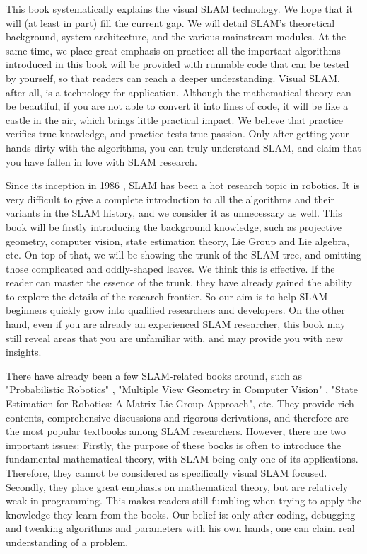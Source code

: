 This book systematically explains the visual SLAM technology. We hope that it will (at least in part) fill the current gap. We will detail SLAM's theoretical background, system architecture, and the various mainstream modules. At the same time, we place great emphasis on practice: all the important algorithms introduced in this book will be provided with runnable code that can be tested by yourself, so that readers can reach a deeper understanding. Visual SLAM, after all, is a technology for application. Although the mathematical theory can be beautiful, if you are not able to convert it into lines of code, it will be like a castle in the air, which brings little practical impact. We believe that practice verifies true knowledge, and practice tests true passion. Only after getting your hands dirty with the algorithms, you can truly understand SLAM, and claim that you have fallen in love with SLAM research.

Since its inception in 1986 \cite{Smith1986}, SLAM has been a hot research topic in robotics. It is very difficult to give a complete introduction to all the algorithms and their variants in the SLAM history, and we consider it as unnecessary as well. This book will be firstly introducing the background knowledge, such as projective geometry, computer vision, state estimation theory, Lie Group and Lie algebra, etc. On top of that, we will be showing the trunk of the SLAM tree, and omitting those complicated and oddly-shaped leaves. We think this is effective. If the reader can master the essence of the trunk, they have already gained the ability to explore the details of the research frontier. So our aim is to help SLAM beginners quickly grow into qualified researchers and developers. On the other hand, even if you are already an experienced SLAM researcher, this book may still reveal areas that you are unfamiliar with, and may provide you with new insights.

There have already been a few SLAM-related books around, such as "Probabilistic Robotics" \cite{Thrun2005}, "Multiple View Geometry in Computer Vision" \cite{Hartley2003}, "State Estimation for Robotics: A Matrix-Lie-Group Approach"\cite{Barfoot2017}, etc. They provide rich contents, comprehensive discussions and rigorous derivations, and therefore are the most popular textbooks among SLAM researchers. However,  there are two important issues: Firstly, the purpose of these books is often to introduce the fundamental mathematical theory, with SLAM being only one of its applications. Therefore, they cannot be considered as specifically visual SLAM focused. Secondly, they place great emphasis on mathematical theory, but are relatively weak in programming. This makes readers still fumbling when trying to apply the knowledge they learn from the books. Our belief is: only after coding, debugging and tweaking algorithms and parameters with his own hands, one can claim real understanding of a problem.

